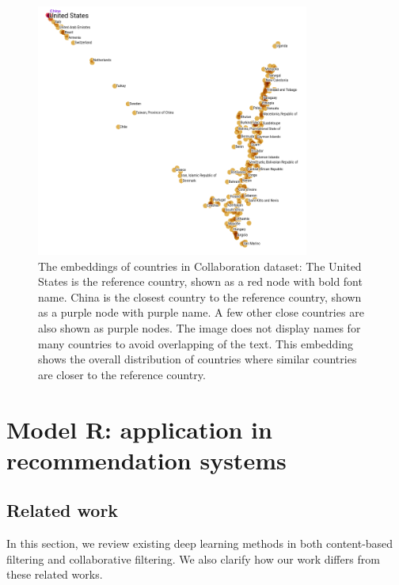 \documentclass[12pt]{WSUThesis}
\theoremstyle{definition}
\begin{document}
\begin{figure}[!ht]\centering
	\includegraphics[width=0.8\textwidth]{countries-annotation}
	\caption{
		The embeddings of countries in Collaboration dataset:
		The United States is the reference country, shown as a red node with bold font name.
		China is the closest country to the reference country, shown as a purple node with purple name.
		A few other close countries are also shown as purple nodes.
		The image does not display names for many countries to avoid overlapping of the text.
		This embedding shows the overall distribution of countries where similar countries are closer to the reference country.
	}
	\label{fig:countries}
\end{figure}

\chapter{Model R: application in recommendation systems}

\section{Related work}
In this section,
we review existing deep learning methods in both content-based 
filtering and collaborative filtering.
We also clarify how our work differs from these related works.
\end{document}
